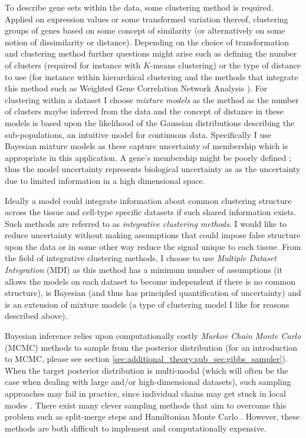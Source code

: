 \documentclass[12pt]{article} %
\begin{document}
	To describe gene sets within the data, some clustering method is required. Applied on expression values or some transformed variation thereof, clustering groups of genes based on some concept of similarity (or alternatively on some notion of dissimilarity or distance). Depending on the choice of transformation and clustering method further questions might arise such as defining the number of clusters (required for instance with $K$-means clustering) or the type of distance to use (for instance within hierarchical clustering and the methods that integrate this method such as Weighted Gene Correlation Network Analysis \citep{zhang2005general}). For clustering within a dataset I choose \emph{mixture models} as the method as the number of clusters maybe inferred from the data and the concept of distance in these models is based upon the likelihood of the Gaussian distributions describing the sub-populations, an intuitive model for continuous data. Specifically I use Bayesian mixture models as these capture uncertainty of membership which is appropriate in this application. A gene's membership might be poorly defined \citep{Pita-JuarezPathwayCoexpressionNetwork2018}; thus the model uncertainty represents biological uncertainty as as the uncertainty due to limited information in a high dimensional space.
	
	Ideally a model could integrate information about common clustering structure across the tissue and cell-type specific datasets if such shared information exists. Such methods are referred to as \emph{integrative clustering methods}. I would like to reduce uncertainty without making assumptions that could impose false structure upon the data or in some other way reduce the signal unique to each tissue. From the field of integrative clustering methods, I choose to use \emph{Multiple Dataset Integration} (MDI) \citep{KirkBayesiancorrelatedclustering2012} as this method has a minimum number of assumptions (it allows the models on each dataset to become independent if there is no common structure), is Bayesian (and thus has principled quantification of uncertainty) and is an extension of mixture models (a type of clustering model I like for reasons described above).
	
	Bayesian inference relies upon computationally costly \emph{Markov Chain Monte Carlo} (MCMC) methods to sample from the posterior distribution (for an introduction to MCMC, please see section \ref{sec:additional_theory:sub_sec:gibbs_sampler}). When the target posterior distribution is multi-modal (which will often be the case when dealing with large and/or high-dimensional datasets), such sampling approaches may fail in practice, since individual chains may get stuck in local modes \citep{TjelmelandModeJumpingProposals2001}. There exist many clever sampling methods that aim to overcome this problem such as split-merge steps \citep{dahl_sequentially-allocated_2005} and Hamiltonian Monte Carlo \citep{duane1987hybrid, hoffman2014no}. However, these methods are both difficult to implement and computationally expensive.
	
\end{document}
